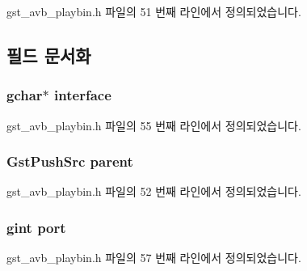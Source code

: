 gst\+\_\+avb\+\_\+playbin.\+h 파일의 51 번째 라인에서 정의되었습니다.



\subsection{필드 문서화}
\subsubsection[{\texorpdfstring{interface}{interface}}]{\setlength{\rightskip}{0pt plus 5cm}gchar$\ast$ interface}\hypertarget{struct___gst_a_v_b_src_a796aab0c0ba78c463684181ccbcac365}{}\label{struct___gst_a_v_b_src_a796aab0c0ba78c463684181ccbcac365}


gst\+\_\+avb\+\_\+playbin.\+h 파일의 55 번째 라인에서 정의되었습니다.

\subsubsection[{\texorpdfstring{parent}{parent}}]{\setlength{\rightskip}{0pt plus 5cm}Gst\+Push\+Src parent}\hypertarget{struct___gst_a_v_b_src_a63157cc62a0e2c6d3184738ae366bbf7}{}\label{struct___gst_a_v_b_src_a63157cc62a0e2c6d3184738ae366bbf7}


gst\+\_\+avb\+\_\+playbin.\+h 파일의 52 번째 라인에서 정의되었습니다.

\subsubsection[{\texorpdfstring{port}{port}}]{\setlength{\rightskip}{0pt plus 5cm}gint port}\hypertarget{struct___gst_a_v_b_src_af501f53114411bfa8e4f46f98af2b5f4}{}\label{struct___gst_a_v_b_src_af501f53114411bfa8e4f46f98af2b5f4}


gst\+\_\+avb\+\_\+playbin.\+h 파일의 57 번째 라인에서 정의되었습니다.

